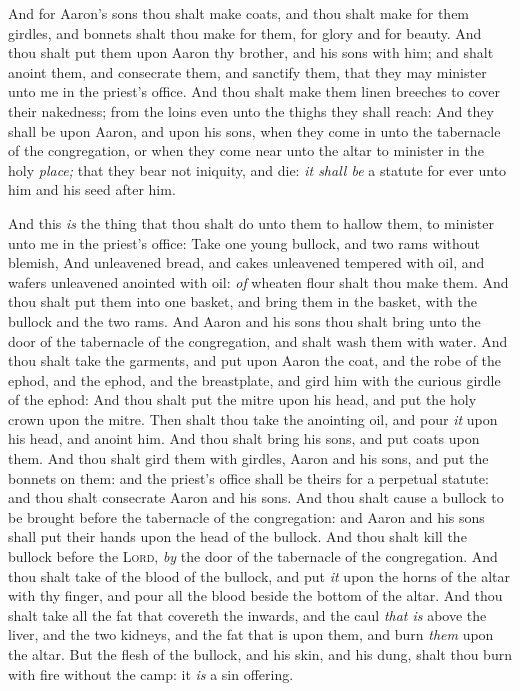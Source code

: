 \documentclass[11pt,letterpaper,oneside]{memoir}
\begin{document}
And for Aaron's sons thou shalt make coats, and thou shalt make for them
girdles, and bonnets shalt thou make for them, for glory and for beauty.
And thou shalt put them upon Aaron thy brother, and his sons with him;
and shalt anoint them, and consecrate them, and sanctify them, that they
may minister unto me in the priest's office. And thou shalt make them
linen breeches to cover their nakedness; from the loins even unto the
thighs they shall reach: And they shall be upon Aaron, and upon his
sons, when they come in unto the tabernacle of the congregation, or when
they come near unto the altar to minister in the holy \emph{place;} that
they bear not iniquity, and die: \emph{it shall be} a statute for ever
unto him and his seed after him.

And this \emph{is} the thing that thou shalt do unto them to hallow
them, to minister unto me in the priest's office: Take one young
bullock, and two rams without blemish, And unleavened bread, and cakes
unleavened tempered with oil, and wafers unleavened anointed with oil:
\emph{of} wheaten flour shalt thou make them. And thou shalt put them
into one basket, and bring them in the basket, with the bullock and the
two rams. And Aaron and his sons thou shalt bring unto the door of the
tabernacle of the congregation, and shalt wash them with water. And thou
shalt take the garments, and put upon Aaron the coat, and the robe of
the ephod, and the ephod, and the breastplate, and gird him with the
curious girdle of the ephod: And thou shalt put the mitre upon his head,
and put the holy crown upon the mitre. Then shalt thou take the
anointing oil, and pour \emph{it} upon his head, and anoint him. And
thou shalt bring his sons, and put coats upon them. And thou shalt gird
them with girdles, Aaron and his sons, and put the bonnets on them: and
the priest's office shall be theirs for a perpetual statute: and thou
shalt consecrate Aaron and his sons. And thou shalt cause a bullock to
be brought before the tabernacle of the congregation: and Aaron and his
sons shall put their hands upon the head of the bullock. And thou shalt
kill the bullock before the \textsc{Lord}, \emph{by} the door of the
tabernacle of the congregation. And thou shalt take of the blood of the
bullock, and put \emph{it} upon the horns of the altar with thy finger,
and pour all the blood beside the bottom of the altar. And thou shalt
take all the fat that covereth the inwards, and the caul \emph{that is}
above the liver, and the two kidneys, and the fat that is upon them, and
burn \emph{them} upon the altar. But the flesh of the bullock, and his
skin, and his dung, shalt thou burn with fire without the camp: it
\emph{is} a sin offering.
\end{document}
